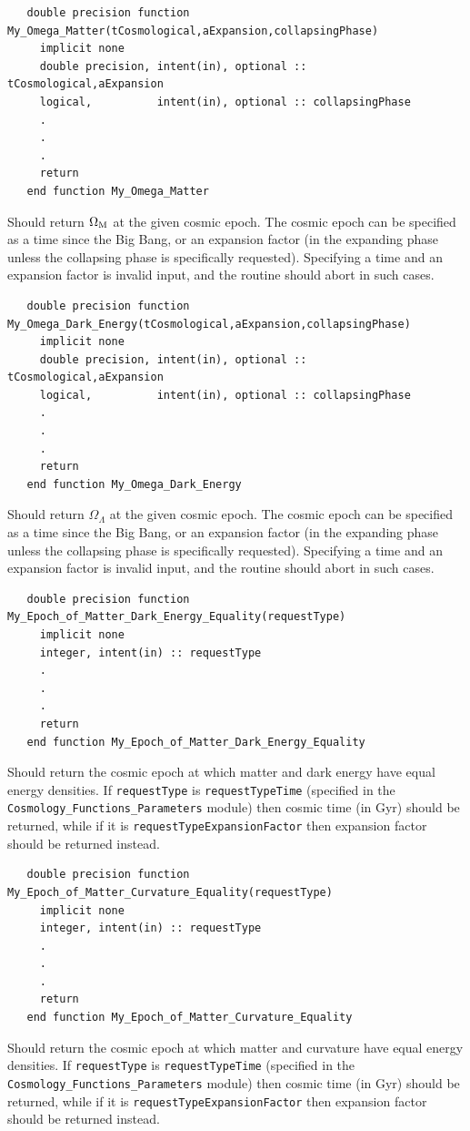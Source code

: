 \begin{verbatim}
   double precision function My_Omega_Matter(tCosmological,aExpansion,collapsingPhase)
     implicit none
     double precision, intent(in), optional :: tCosmological,aExpansion
     logical,          intent(in), optional :: collapsingPhase
     .
     .
     .
     return
   end function My_Omega_Matter
\end{verbatim}
Should return $\Omega_{\rm M}$ at the given cosmic epoch. The cosmic epoch can be specified as a time since the Big Bang, or an expansion factor (in the expanding phase unless the collapsing phase is specifically requested). Specifying a time and an expansion factor is invalid input, and the routine should abort in such cases.

\begin{verbatim}
   double precision function My_Omega_Dark_Energy(tCosmological,aExpansion,collapsingPhase)
     implicit none
     double precision, intent(in), optional :: tCosmological,aExpansion
     logical,          intent(in), optional :: collapsingPhase
     .
     .
     .
     return
   end function My_Omega_Dark_Energy
\end{verbatim}
Should return $\Omega_\Lambda$ at the given cosmic epoch. The cosmic epoch can be specified as a time since the Big Bang, or an expansion factor (in the expanding phase unless the collapsing phase is specifically requested). Specifying a time and an expansion factor is invalid input, and the routine should abort in such cases.

\begin{verbatim}
   double precision function My_Epoch_of_Matter_Dark_Energy_Equality(requestType)
     implicit none
     integer, intent(in) :: requestType
     .
     .
     .
     return
   end function My_Epoch_of_Matter_Dark_Energy_Equality
\end{verbatim}
Should return the cosmic epoch at which matter and dark energy have equal energy densities. If {\tt requestType} is {\tt requestTypeTime} (specified in the {\tt Cosmology\_Functions\_Parameters} module) then cosmic time (in Gyr) should be returned, while if it is {\tt requestTypeExpansionFactor} then expansion factor should be returned instead.

\begin{verbatim}
   double precision function My_Epoch_of_Matter_Curvature_Equality(requestType)
     implicit none
     integer, intent(in) :: requestType
     .
     .
     .
     return
   end function My_Epoch_of_Matter_Curvature_Equality
\end{verbatim}
Should return the cosmic epoch at which matter and curvature have equal energy densities. If {\tt requestType} is {\tt requestTypeTime} (specified in the {\tt Cosmology\_Functions\_Parameters} module) then cosmic time (in Gyr) should be returned, while if it is {\tt requestTypeExpansionFactor} then expansion factor should be returned instead.

